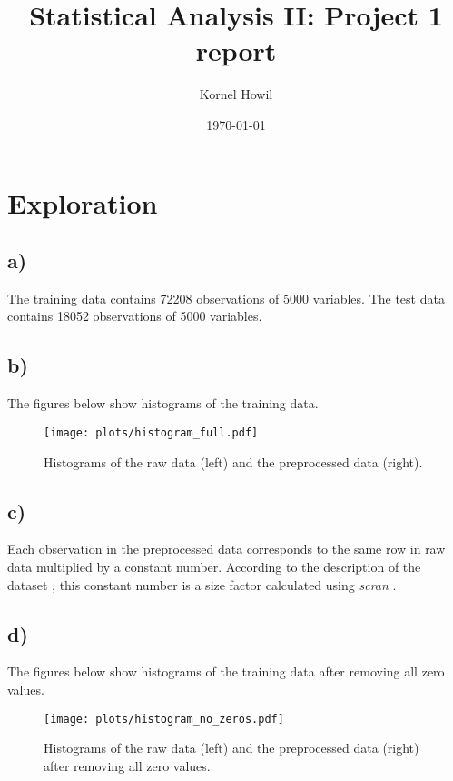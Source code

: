 \documentclass[a4paper,11pt]{article}
\begin{document}
\title{Statistical Analysis II: Project 1 report}

\author{Kornel Howil}

\date{\today}

\maketitle

\section{Exploration}
\subsection*{a)} The training data contains 72208 observations of 5000 variables. The test data contains 18052 observations of 5000 variables.

\subsection*{b)} The figures below show histograms of the training data.
\begin{figure}[H]
    \centering
    \texttt{[image: plots/histogram\_full.pdf]}
    \caption{Histograms of the raw data (left) and the preprocessed data (right).}
    \label{fig1}
\end{figure}

\subsection*{c)} 
Each observation in the preprocessed data corresponds to the same row in raw data multiplied by a constant number. According to the description of the dataset \cite{data}, this constant number is a size factor calculated using \textit{scran} \cite{scran}.

\subsection*{d)} The figures below show histograms of the training data after removing all zero values.
\begin{figure}[H]
    \centering
    \texttt{[image: plots/histogram\_no\_zeros.pdf]}
    \caption{Histograms of the raw data (left) and the preprocessed data (right) after removing all zero values.}
    \label{fig2}
\end{figure}
\end{document}
